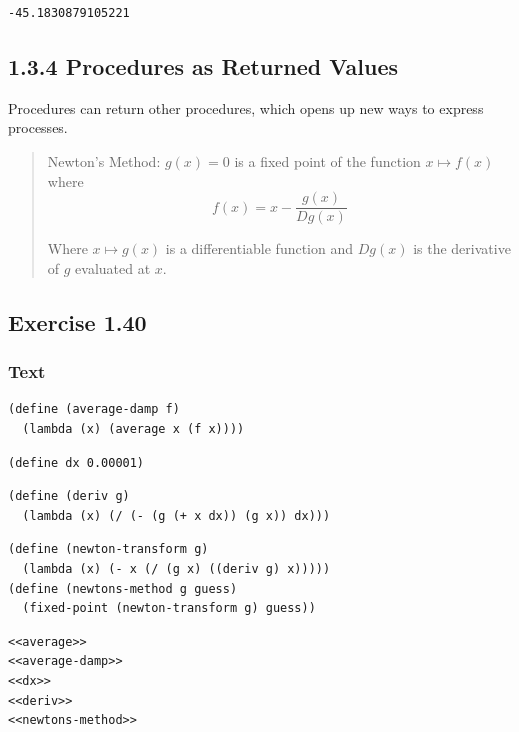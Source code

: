 \documentclass[final,fleqn,titlepage,twoside]{article}
\begin{document}
\begin{verbatim}
-45.1830879105221
\end{verbatim}

\subsection{1.3.4 Procedures as Returned Values}
\label{sec:orgda8f430}
Procedures can return other procedures, which opens up new ways to express
processes.

\begin{quote}
Newton's Method: \(g(x)=0\) is a fixed point of the function \(x \mapsto f(x)\)
where \[f(x)=x-\frac{g(x)}{Dg(x)}\]

Where \(x \mapsto g(x)\) is a differentiable function and \(Dg(x)\) is the
derivative of \(g\) evaluated at \(x\).
\end{quote}

\subsection{Exercise 1.40}
\label{sec:org16a9da5}
\subsubsection{Text}
\label{sec:orgf9061a5}
\begin{verbatim}
(define (average-damp f)
  (lambda (x) (average x (f x))))
\end{verbatim}

\begin{verbatim}
(define dx 0.00001)
\end{verbatim}

\begin{verbatim}
(define (deriv g)
  (lambda (x) (/ (- (g (+ x dx)) (g x)) dx)))
\end{verbatim}

\begin{verbatim}
(define (newton-transform g)
  (lambda (x) (- x (/ (g x) ((deriv g) x)))))
(define (newtons-method g guess)
  (fixed-point (newton-transform g) guess))
\end{verbatim}
\begin{verbatim}
<<average>>
<<average-damp>>
<<dx>>
<<deriv>>
<<newtons-method>>
\end{verbatim}
\end{document}
